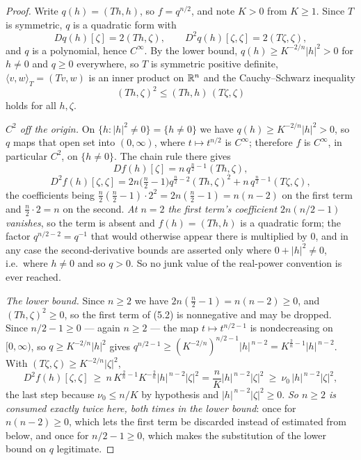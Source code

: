 \begin{proof}
Write $q(h)=(Th,h)$, so $f=q^{n/2}$, and note $K>0$ from $K\ge1$.  Since $T$ is
symmetric, $q$ is a quadratic form with
\[
Dq(h)[\zeta]=2(Th,\zeta),\qquad D^2q(h)[\zeta,\zeta]=2(T\zeta,\zeta),
\]
and $q$ is a polynomial, hence $C^\infty$.  By the lower bound,
$q(h)\ge K^{-2/n}|h|^2>0$ for $h\ne0$ and $q\ge0$ everywhere, so $T$ is
symmetric positive definite, $\langle v,w\rangle_T=(Tv,w)$ is an inner product
on $\mathbb{R}^n$ and the Cauchy--Schwarz inequality
\[
(Th,\zeta)^2\le(Th,h)\,(T\zeta,\zeta)
\tag{5.1}
\]
holds for all $h,\zeta$.

\emph{$C^2$ off the origin.}  On $\{h:|h|^2\ne0\}=\{h\ne0\}$ we have
$q(h)\ge K^{-2/n}|h|^2>0$, so $q$ maps that open set into $(0,\infty)$, where
$t\mapsto t^{n/2}$ is $C^\infty$; therefore $f$ is $C^\infty$, in particular
$C^2$, on $\{h\ne0\}$.  The chain rule there gives
\[
Df(h)[\zeta]=n\,q^{\frac n2-1}(Th,\zeta),
\]
\[
D^2f(h)[\zeta,\zeta]
=2n\bigl(\tfrac n2-1\bigr)q^{\frac n2-2}(Th,\zeta)^2
+n\,q^{\frac n2-1}(T\zeta,\zeta),
\tag{5.2}
\]
the coefficients being $\tfrac n2(\tfrac n2-1)\cdot2^2=2n(\tfrac n2-1)=n(n-2)$ on
the first term and $\tfrac n2\cdot2=n$ on the second.  \emph{At $n=2$ the first
term's coefficient $2n(n/2-1)$ vanishes}, so the term is absent and
$f(h)=(Th,h)$ is a quadratic form; the factor $q^{n/2-2}=q^{-1}$ that
would otherwise appear there is multiplied by $0$, and in any case the
second-derivative bounds are asserted only where $0+|h|^2\ne0$, i.e.\ where
$h\ne0$ and so $q>0$.  So no junk value of the real-power convention is ever
reached.

\emph{The lower bound.}  Since $n\ge2$ we have $2n(\tfrac n2-1)=n(n-2)\ge0$, and
$(Th,\zeta)^2\ge0$, so the first term of (5.2) is nonnegative and may be
dropped.  Since $n/2-1\ge0$ --- again $n\ge2$ --- the map $t\mapsto t^{n/2-1}$ is
nondecreasing on $[0,\infty)$, so $q\ge K^{-2/n}|h|^2$ gives
$q^{n/2-1}\ge(K^{-2/n})^{n/2-1}|h|^{\,n-2}=K^{\frac2n-1}|h|^{\,n-2}$.  With
$(T\zeta,\zeta)\ge K^{-2/n}|\zeta|^2$,
\[
D^2f(h)[\zeta,\zeta]\ \ge\ n\,K^{\frac2n-1}K^{-\frac2n}|h|^{\,n-2}|\zeta|^2
=\frac nK|h|^{\,n-2}|\zeta|^2\ \ge\ \nu_0\,|h|^{\,n-2}|\zeta|^2 ,
\]
the last step because $\nu_0\le n/K$ by hypothesis and
$|h|^{\,n-2}|\zeta|^2\ge0$.  \emph{So $n\ge2$ is consumed exactly twice here,
both times in the lower bound}: once for $n(n-2)\ge0$, which lets the first term
be discarded instead of estimated from below, and once for $n/2-1\ge0$, which
makes the substitution of the lower bound on $q$ legitimate.


\end{proof}
